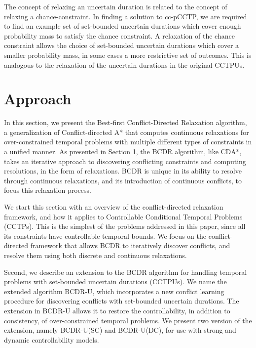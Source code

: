 \documentclass[jair,twoside,11pt,theapa]{article}
\begin{document}
The concept of relaxing an uncertain duration is related to the concept of relaxing a chance-constraint. In finding a solution to cc-pCCTP, we are required to find an example set of set-bounded uncertain durations which cover enough probability mass to satisfy the chance constraint. A relaxation of the chance constraint allows the choice of set-bounded uncertain durations which cover a smaller probability mass, in some cases a more restrictive set of outcomes. This is analogous to the relaxation of the uncertain durations in the original CCTPUs.






\section{Approach}


In this section, we present the Best-first Conflict-Directed Relaxation
algorithm, a generalization of Conflict-directed A* \cite{Williams_CDAstar_2002}
that computes continuous relaxations for over-constrained temporal problems with
multiple different types of constraints in a unified manner. As presented in
Section 1, the BCDR algorithm, like CDA*, takes an iterative approach to discovering
conflicting constraints and computing resolutions, in the form of relaxations.
BCDR is unique in its ability to resolve through continuous relaxations, and its
introduction of continuous conflicts, to focus this relaxation process.


We start this section with an overview of the conflict-directed relaxation
framework, and how it applies to Controllable Conditional Temporal Problems
(CCTPs). This is the simplest of the problems addressed in this paper, since all
its constraints have controllable temporal bounds. We focus on the conflict-directed framework that allows BCDR to iteratively discover conflicts, and resolve them using both discrete and continuous relaxations. 


Second, we describe an extension to the BCDR algorithm for handling temporal
problems with set-bounded uncertain durations (CCTPUs). We name the extended
algorithm BCDR-U, which incorporates a new conflict learning procedure for
discovering conflicts with set-bounded uncertain durations. The extension in BCDR-U
allows it to restore the controllability, in addition to consistency, of
over-constrained temporal problems. We present two version of the extension, namely BCDR-U(SC) and BCDR-U(DC), for use with strong and dynamic controllability models. 
\end{document}
